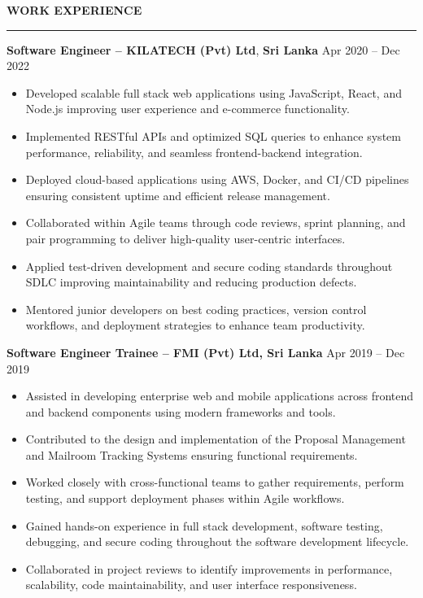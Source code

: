 \documentclass[10pt,letterpaper]{article}
\begin{document}
\vspace{8pt}

\textbf{WORK EXPERIENCE}\\[-8pt]
\noindent\rule{\textwidth}{1pt}

\vspace{-2pt}

\textbf{Software Engineer -- KILATECH (Pvt) Ltd}, \textbf{Sri Lanka} \hfill Apr 2020 -- Dec 2022

\vspace{-1pt}

\begin{itemize}
\item Developed scalable full stack web applications using JavaScript, React, and Node.js improving user experience and e-commerce functionality.
\item Implemented RESTful APIs and optimized SQL queries to enhance system performance, reliability, and seamless frontend-backend integration.
\item Deployed cloud-based applications using AWS, Docker, and CI/CD pipelines ensuring consistent uptime and efficient release management.
\item Collaborated within Agile teams through code reviews, sprint planning, and pair programming to deliver high-quality user-centric interfaces.
\item Applied test-driven development and secure coding standards throughout SDLC improving maintainability and reducing production defects.
\item Mentored junior developers on best coding practices, version control workflows, and deployment strategies to enhance team productivity.
\end{itemize}

\textbf{Software Engineer Trainee -- FMI (Pvt) Ltd, Sri Lanka} \hfill Apr 2019 -- Dec 2019

\vspace{-1pt}

\begin{itemize}
\item Assisted in developing enterprise web and mobile applications across frontend and backend components using modern frameworks and tools.
\item Contributed to the design and implementation of the Proposal Management and Mailroom Tracking Systems ensuring functional requirements.
\item Worked closely with cross-functional teams to gather requirements, perform testing, and support deployment phases within Agile workflows.
\item Gained hands-on experience in full stack development, software testing, debugging, and secure coding throughout the software development lifecycle.
\item Collaborated in project reviews to identify improvements in performance, scalability, code maintainability, and user interface responsiveness.
\end{itemize}
\end{document}
